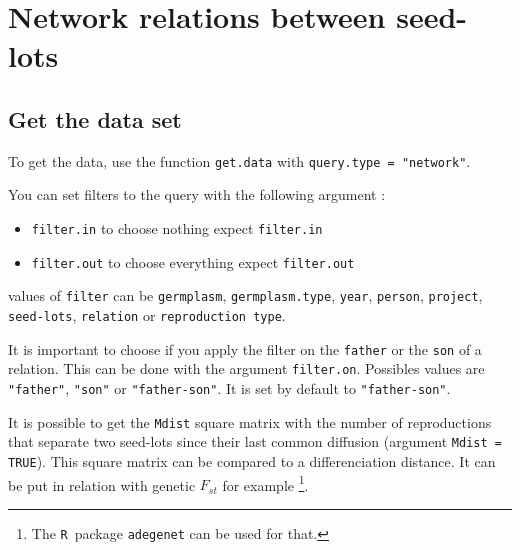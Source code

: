 \documentclass{article}\usepackage[]{graphicx}\usepackage[]{color}
\newcommand{\R}{\texttt{R}}
\renewcommand{\sl}{seed-lots}
\begin{document}
\newpage


\section{Network relations between \sl }
\label{network}

\subsection{Get the data set}

To get the data, use the function \texttt{get.data} with \texttt{query.type = "network"}.

You can set filters to the query with the following argument :

\begin{itemize}
\item \texttt{filter.in} to choose nothing expect \texttt{filter.in}
\item \texttt{filter.out} to choose everything expect \texttt{filter.out}
\end{itemize}

values of \texttt{filter} can be \texttt{germplasm}, \texttt{germplasm.type}, \texttt{year}, \texttt{person}, \texttt{project}, \texttt{\sl}, \texttt{relation} or \texttt{reproduction type}.


It is important to choose if you apply the filter on the \texttt{father} or the \texttt{son} of a relation.
This can be done with the argument \texttt{filter.on}.
Possibles values are \texttt{"father"}, \texttt{"son"} or \texttt{"father-son"}.
It is set by default to \texttt{"father-son"}.

It is possible to get the \texttt{Mdist} square matrix with the number of reproductions that separate two seed-lots since their last common diffusion (argument \texttt{Mdist = TRUE}).
This square matrix can be compared to a differenciation distance. 
It can be put in relation with genetic $F_{st}$ for example \citep{nei_analysis_1973}\footnote{The \R~package \texttt{adegenet} can be used for that.}.
\end{document}
